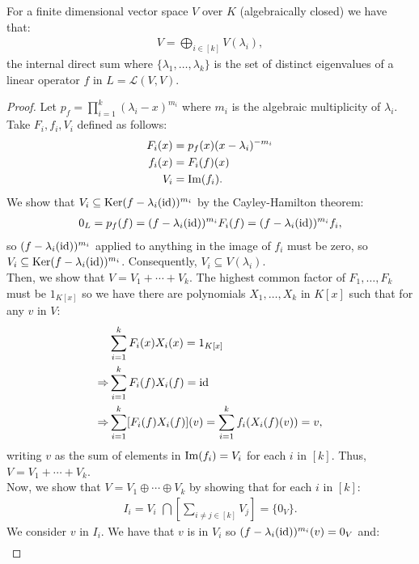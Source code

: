 For a finite dimensional vector space $V$ over $K$ (algebraically closed) we have
that: \begin{gather*}
  V = \bigoplus_{i \in [k]} V(\lambda_i),
\end{gather*} the internal direct sum where $\{\lambda_1, \ldots, \lambda_k\}$ 
is the set of distinct eigenvalues of a linear operator $f$ in 
$L = \mathcal{L}(V, V)$.
\begin{proof}
    Let $p_f = \prod_{i = 1}^k (\lambda_i - x)^{m_i}$ where $m_i$ is
    the algebraic multiplicity of $\lambda_i$. Take $F_i, f_i, V_i$ defined as follows:
    \begin{align*}
        F_i(x) &= p_f(x)(x - \lambda_i)^{-m_i} \\
        f_i(x) &= F_i(f)(x) \\
        V_i    &= \operatorname{Im}(f_i).
    \end{align*} We show that $V_i \subseteq \operatorname{Ker}(f - \lambda_i(\operatorname{id}))^{m_i}$ 
    by the Cayley-Hamilton theorem: \begin{gather*}
        0_L = p_f(f) = (f - \lambda_i(\operatorname{id}))^{m_i}F_i(f) = (f - \lambda_i(\operatorname{id}))^{m_i}f_i,
    \end{gather*} so $(f - \lambda_i(\operatorname{id}))^{m_i}$ applied to anything in the image
    of $f_i$ must be zero, so $V_i \subseteq \operatorname{Ker}(f - \lambda_i(\operatorname{id}))^{m_i}$.
    Consequently, $V_i \subseteq V(\lambda_i)$.
    \\[\baselineskip]
    Then, we show that $V = V_1 + \cdots + V_k$. The highest common factor
    of $F_1, \ldots, F_k$ must be $1_{K[x]}$ so we have there are polynomials
    $X_1, \ldots, X_k$ in $K[x]$ such that for any $v$ in $V$: \begin{align*}
        &\sum_{i = 1}^k F_i(x)X_i(x) = 1_{K[x]} \\
        \Rightarrow &\sum_{i = 1}^k F_i(f)X_i(f) = \operatorname{id} \\
        \Rightarrow &\sum_{i = 1}^k [F_i(f)X_i(f)](v) 
        = \sum_{i = 1}^k f_i(X_i(f)(v)) = v,
    \end{align*} writing $v$ as the sum of elements in $\operatorname{Im}(f_i) = V_i$ for
    each $i$ in $[k]$. Thus, $V = V_1 + \cdots + V_k$.
    \\[\baselineskip]
    Now, we show that $V = V_1 \oplus \cdots \oplus V_k$ by showing that
    for each $i$ in $[k]$: \begin{gather*}
        I_i = V_i \, \, \bigcap \left[ \sum_{i \neq j \in [k]} V_j \right] = \{0_V\}.
    \end{gather*} We consider $v$ in $I_i$. We have that
    $v$ is in $V_i$ so $(f - \lambda_i(\operatorname{id}))^{m_i}(v) = 0_V$ and: \begin{gather} \label{pdp1}

\end{gather}
\end{proof}
